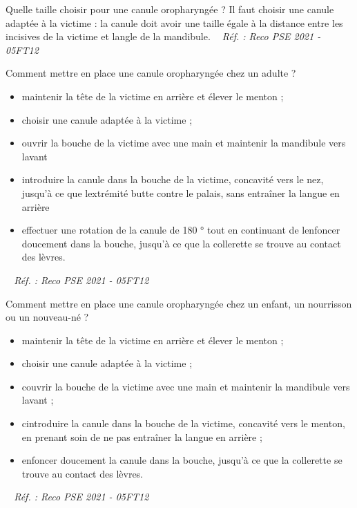\documentclass[grid,avery5371,landscape]{flashcards}
\makeatletter
\newcounter{nocarte}
\newcommand{\categ}[1]{%
  \def\@categ{#1}%
  \setcounter{nocarte}{0}%
}
\newcommand{\source}[1]{%
  \medskip
  \itshape%
   ~ \hfill Réf. : #1}
\makeatother
\begin{document}
\color[HTML]{003273}
\categ{PSE}
\begin{flashcard}[matériel]{
 Quelle taille choisir pour une canule oropharyngée ?   }
  Il faut choisir une canule adaptée à la victime : la canule doit avoir une taille égale à la distance entre les incisives de la victime et langle de la mandibule.
  \source{Reco PSE 2021 - 05FT12}
\end{flashcard}


\color[HTML]{003273}
\categ{PSE}
\begin{flashcard}[geste]{
 Comment mettre en place une canule oropharyngée chez un adulte ?   }
  \begin{itemize}
\item maintenir la tête de la victime en arrière et élever le menton ;
\item choisir une canule adaptée à la victime ;
\item ouvrir la bouche de la victime avec une main et maintenir la mandibule vers lavant
\item introduire la canule dans la bouche de la victime, concavité vers le nez, jusqu'à ce que lextrémité butte
contre le palais, sans entraîner la langue en arrière
\item effectuer une rotation de la canule de 180 ° tout en continuant de lenfoncer doucement dans la
bouche, jusqu'à ce que la collerette se trouve au contact des lèvres.
\end{itemize}
  \source{Reco PSE 2021 - 05FT12}
\end{flashcard}


\color[HTML]{003273}
\categ{PSE}
\begin{flashcard}[geste]{
 Comment mettre en place une canule oropharyngée chez un enfant, un nourrisson ou un nouveau-né ?   }
  \begin{itemize}
\item maintenir la tête de la victime en arrière et élever le menton ;
\item choisir une canule adaptée à la victime ;
\item couvrir la bouche de la victime avec une main et maintenir la mandibule vers lavant ;
\item cintroduire la canule dans la bouche de la victime, concavité vers le menton, en prenant soin de ne pas entraîner la langue en arrière ;
\item enfoncer doucement la canule dans la bouche, jusqu'à ce que la collerette se trouve au contact des lèvres.
\end{itemize}
  \source{Reco PSE 2021 - 05FT12}
\end{flashcard}
\end{document}
